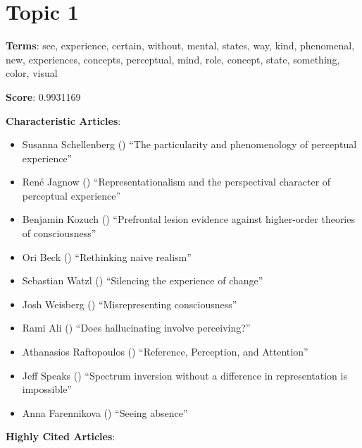 \documentclass[
  10pt,
  letterpaper,
  DIV=11,
  numbers=noendperiod,
  twoside]{scrartcl}
\providecommand{\tightlist}{%
  \setlength{\itemsep}{0pt}\setlength{\parskip}{0pt}}\usepackage{longtable,booktabs,array}
\begin{document}
\section{Topic 1}\label{topic-1}

\textbf{Terms}: see, experience, certain, without, mental, states, way,
kind, phenomenal, new, experiences, concepts, perceptual, mind, role,
concept, state, something, color, visual

\textbf{Score}: 0.9931169

\textbf{Characteristic Articles}:

\begin{itemize}
\tightlist
\item
  Susanna Schellenberg () ``The
  particularity and phenomenology of perceptual experience''
\item
  René Jagnow ()
  ``Representationalism and the perspectival character of perceptual
  experience''
\item
  Benjamin Kozuch () ``Prefrontal
  lesion evidence against higher-order theories of consciousness''
\item
  Ori Beck () ``Rethinking naive
  realism''
\item
  Sebastian Watzl () ``Silencing
  the experience of change''
\item
  Josh Weisberg ()
  ``Misrepresenting consciousness''
\item
  Rami Ali () ``Does
  hallucinating involve perceiving?''
\item
  Athanasios Raftopoulos ()
  ``Reference, Perception, and Attention''
\item
  Jeff Speaks () ``Spectrum
  inversion without a difference in representation is impossible''
\item
  Anna Farennikova () ``Seeing
  absence''
\end{itemize}

\textbf{Highly Cited Articles}:
\end{document}
